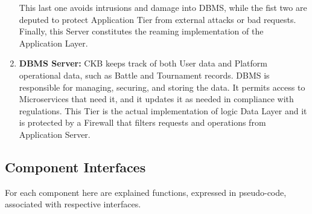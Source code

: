 \begin{enumerate}[label=$\bullet$]
    This last one avoids intrusions and damage into DBMS, while the fist two are deputed to protect Application Tier from external attacks or bad requests. Finally, this Server constitutes the reaming implementation of the Application Layer.
    \item \textbf{DBMS Server:} CKB keeps track of both User data and Platform operational data, such as Battle and Tournament records. DBMS is responsible for managing, securing, and storing the data. It permits access to 
    Microservices that need it, and it updates it as needed in compliance with regulations. This Tier is the actual implementation of logic Data Layer and it is protected by a Firewall that filters requests and operations from Application Server. 
\end{enumerate}

\subsection{Component Interfaces}
For each component here are explained functions, expressed in pseudo-code, associated with respective interfaces.

